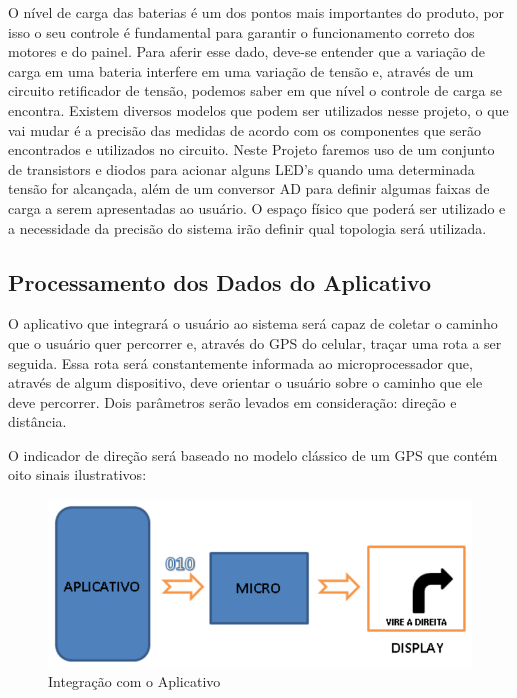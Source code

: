 		O nível de carga das baterias é um dos pontos mais importantes do produto, por isso o seu controle é fundamental para garantir o funcionamento correto dos motores e do painel. Para aferir esse dado, deve-se entender que a variação de carga em uma bateria interfere em uma variação de tensão e, através de um circuito retificador de tensão, podemos saber em que nível o controle de carga se encontra. Existem diversos modelos que podem ser utilizados nesse projeto, o que vai mudar é a precisão das medidas de acordo com os componentes que serão encontrados e utilizados no circuito.
		Neste Projeto faremos uso de um conjunto de transistors e diodos para acionar alguns LED's quando uma determinada tensão for alcançada, além de um conversor AD para definir algumas faixas de carga a serem apresentadas ao usuário. O espaço físico que poderá ser utilizado e a necessidade da precisão do sistema irão definir qual topologia será utilizada.
			

	\subsection{Processamento dos Dados do Aplicativo}
	O aplicativo que integrará o usuário ao sistema será capaz de coletar o caminho que o usuário quer percorrer e, através do GPS do celular, traçar uma rota a ser seguida. Essa rota será constantemente informada ao microprocessador que, através de algum dispositivo, deve orientar o usuário sobre o caminho que ele deve percorrer. Dois parâmetros serão levados em consideração: direção e distância.

	O indicador de direção será baseado no modelo clássico de um GPS que contém oito sinais ilustrativos:

	\graphicspath{{figuras/}}
	\begin{figure}[h!]
		\centering
		\includegraphics[scale=0.80]{Figura_10_Integracao_com_o_aplicativo.PNG}
		\caption{Integração com o Aplicativo}
		\label{img:Integracao_com_o_aplicativo}
	\end{figure}
	
